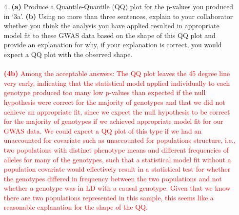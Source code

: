 \documentclass[letterpaper, 11pt]{article}
\begin{document}
\begin{itemize}
\item[4.]  \textbf{(a)} Produce a Quantile-Quantile (QQ) plot for the p-values you produced in `3a'.  \textbf{(b)} Using no more than three sentences, explain to your collaborator whether you think the analysis you have applied resulted in appropriate model fit to these GWAS data based on the shape of this QQ plot and provide an explanation for why, if your explanation is correct, you would expect a QQ plot with the observed shape.
\\
\\
 \textcolor{red}{ 
\textbf{(4b)} Among the acceptable answers: The QQ plot leaves the 45 degree line very early, indicating that the statistical model applied individually to each genotype produced too many low p-values than expected if the null hypothesis were correct for the majority of genotypes and that we did not achieve an appropriate fit, since we expect the null hypothesis to be correct for the majority of genotypes if we achieved appropriate model fit for our GWAS data.  We could expect a QQ plot of this type if we had an unaccounted for covariate such as unaccounted for populations structure, i.e., two populations with distinct phenotype means and different frequencies of alleles for many of the genotypes, such that a statistical model fit without a population covariate would effectively result in a statistical test for whether the genotypes differed in frequency between the two populations and not whether a genotype was in LD with a causal genotype.  Given that we know there are two populations represented in this sample, this seems like a reasonable explanation for the shape of the QQ.
} 


\end{itemize}
\end{document}
